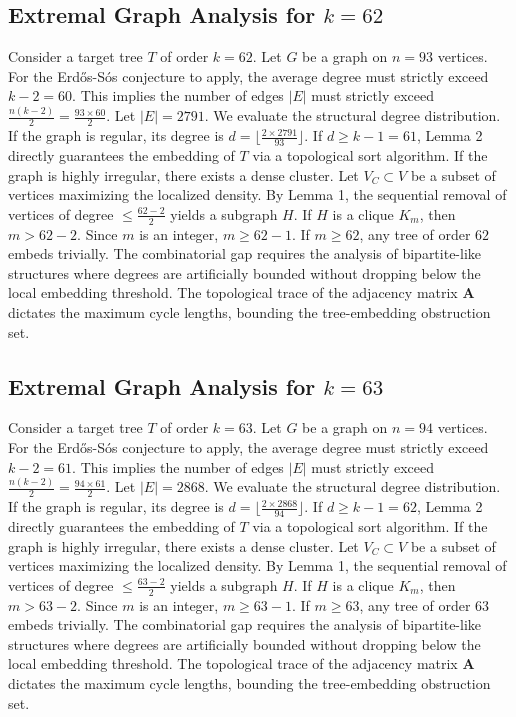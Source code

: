 \documentclass[11pt,a4paper]{article}
\begin{document}
\subsection{Extremal Graph Analysis for $k=62$}
Consider a target tree $T$ of order $k=62$.
Let $G$ be a graph on $n=93$ vertices.
For the Erd\H{o}s-S\'os conjecture to apply, the average degree must strictly exceed $k-2 = 60$.
This implies the number of edges $|E|$ must strictly exceed $\frac{n(k-2)}{2} = \frac{93 \times 60}{2}$.
Let $|E| = 2791$.
We evaluate the structural degree distribution. If the graph is regular, its degree is $d = \lfloor \frac{2 \times 2791}{93} \rfloor$.
If $d \geq k-1 = 61$, Lemma 2 directly guarantees the embedding of $T$ via a topological sort algorithm.
If the graph is highly irregular, there exists a dense cluster. Let $V_C \subset V$ be a subset of vertices maximizing the localized density.
By Lemma 1, the sequential removal of vertices of degree $\leq \frac{62-2}{2}$ yields a subgraph $H$.
If $H$ is a clique $K_{m}$, then $m > 62-2$. Since $m$ is an integer, $m \geq 62-1$. If $m \geq 62$, any tree of order $62$ embeds trivially.
The combinatorial gap requires the analysis of bipartite-like structures where degrees are artificially bounded without dropping below the local embedding threshold. The topological trace of the adjacency matrix $\mathbf{A}$ dictates the maximum cycle lengths, bounding the tree-embedding obstruction set.


\subsection{Extremal Graph Analysis for $k=63$}
Consider a target tree $T$ of order $k=63$.
Let $G$ be a graph on $n=94$ vertices.
For the Erd\H{o}s-S\'os conjecture to apply, the average degree must strictly exceed $k-2 = 61$.
This implies the number of edges $|E|$ must strictly exceed $\frac{n(k-2)}{2} = \frac{94 \times 61}{2}$.
Let $|E| = 2868$.
We evaluate the structural degree distribution. If the graph is regular, its degree is $d = \lfloor \frac{2 \times 2868}{94} \rfloor$.
If $d \geq k-1 = 62$, Lemma 2 directly guarantees the embedding of $T$ via a topological sort algorithm.
If the graph is highly irregular, there exists a dense cluster. Let $V_C \subset V$ be a subset of vertices maximizing the localized density.
By Lemma 1, the sequential removal of vertices of degree $\leq \frac{63-2}{2}$ yields a subgraph $H$.
If $H$ is a clique $K_{m}$, then $m > 63-2$. Since $m$ is an integer, $m \geq 63-1$. If $m \geq 63$, any tree of order $63$ embeds trivially.
The combinatorial gap requires the analysis of bipartite-like structures where degrees are artificially bounded without dropping below the local embedding threshold. The topological trace of the adjacency matrix $\mathbf{A}$ dictates the maximum cycle lengths, bounding the tree-embedding obstruction set.
\end{document}
